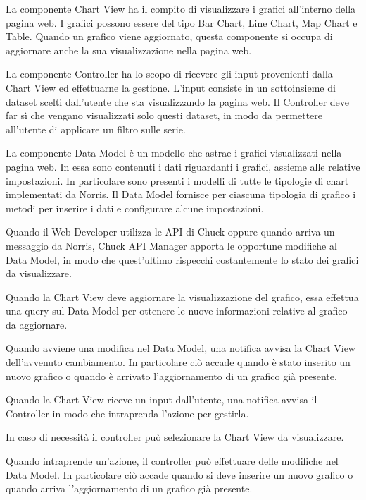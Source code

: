 			La componente Chart View ha il compito di visualizzare i grafici all'interno della pagina web. I grafici possono essere del tipo Bar Chart, Line Chart, Map Chart e Table. Quando un grafico viene aggiornato, questa componente si occupa di aggiornare anche la sua visualizzazione nella pagina web.

			La componente Controller ha lo scopo di ricevere gli input provenienti dalla Chart View ed effettuarne la gestione. L'input consiste in un sottoinsieme di dataset scelti dall'utente che sta visualizzando la pagina web. Il Controller deve far sì che vengano visualizzati solo questi dataset, in modo da permettere all'utente di applicare un filtro sulle serie.

			La componente Data Model è un modello che astrae i grafici visualizzati nella pagina web. In essa sono contenuti i dati riguardanti i grafici, assieme alle relative impostazioni. In particolare sono presenti i modelli di tutte le tipologie di chart implementati da Norris. Il Data Model fornisce per ciascuna tipologia di grafico i metodi per inserire i dati e configurare alcune impostazioni. 
    
	
		Quando il Web Developer utilizza le API di Chuck oppure quando arriva un messaggio da Norris, Chuck API Manager apporta le opportune modifiche al Data Model, in modo che quest'ultimo rispecchi costantemente lo stato dei grafici da visualizzare.

		Quando la Chart View deve aggiornare la visualizzazione del grafico, essa effettua una query sul Data Model per ottenere le nuove informazioni relative al grafico da aggiornare.

		Quando avviene una modifica nel Data Model, una notifica avvisa la Chart View dell'avvenuto cambiamento. In particolare ciò accade quando è stato inserito un nuovo grafico o quando è arrivato l'aggiornamento di un grafico già presente.

		Quando la Chart View riceve un input dall'utente, una notifica avvisa il Controller in modo che intraprenda l'azione per gestirla.

		In caso di necessità il controller può selezionare la Chart View da visualizzare.
		
		Quando intraprende un'azione, il controller può effettuare delle modifiche nel Data Model. In particolare ciò accade quando si deve inserire un nuovo grafico o quando arriva l'aggiornamento di un grafico già presente.
